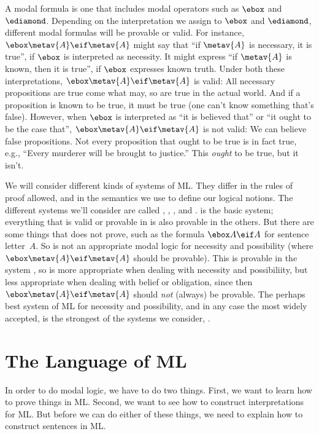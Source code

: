 A modal formula is one that includes modal operators such as $\ebox$ and $\ediamond$. Depending on the interpretation we assign to $\ebox$ and $\ediamond$, different modal formulas will be provable or valid. For instance, $\ebox \metav{A} \eif \metav{A}$ might say that ``if $\metav{A}$ is necessary, it is true'', if $\ebox$ is interpreted as necessity. It might express ``if $\metav{A}$ is known, then it is true'', if $\ebox$ expresses known truth. Under both these interpretations, $\ebox\metav{A} \eif \metav{A}$ is valid: All necessary propositions are true come what may, so are true in the actual world. And if a proposition is known to be true, it must be true (one can't know something that's false). However, when $\ebox$ is interpreted as ``it is believed that'' or ``it ought to be the case that'', $\ebox\metav{A} \eif \metav{A}$ is not valid: We can believe false propositions. Not every proposition that ought to be true is in fact true, e.g., ``Every murderer will be brought to justice.'' This \emph{ought} to be true, but it isn't.

We will consider different kinds of systems of ML. They differ in the rules of proof allowed, and in the semantics we use to define our logical notions. The different systems we'll consider are called \mlK, \mlT, \mlSfour, and \mlSfive. \mlK{} is the basic system; everything that is valid or provable in \mlK{} is also provable in the others. But there are some things that \mlK{} does not prove, such as the formula $\ebox A \eif A$ for sentence letter~$A$. So \mlK{} is not an appropriate modal logic for necessity and possibility (where $\ebox\metav{A} \eif \metav{A}$ should be provable). This is provable in the system \mlT, so \mlT{} is more appropriate when dealing with necessity and possibiliity, but less appropriate when dealing with belief or obligation, since then $\ebox\metav{A} \eif \metav{A}$ should \emph{not} (always) be provable. The perhaps best system of ML for necessity and possibility, and in any case the most widely accepted, is the strongest of the systems we consider, \mlSfive.

\section{The Language of ML}
\label{TFLtoML}

In order to do modal logic, we have to do two things. First, we want to learn how to prove things in ML. Second, we want to see how to construct interpretations for ML. But before we can do either of these things, we need to explain how to construct sentences in ML.

